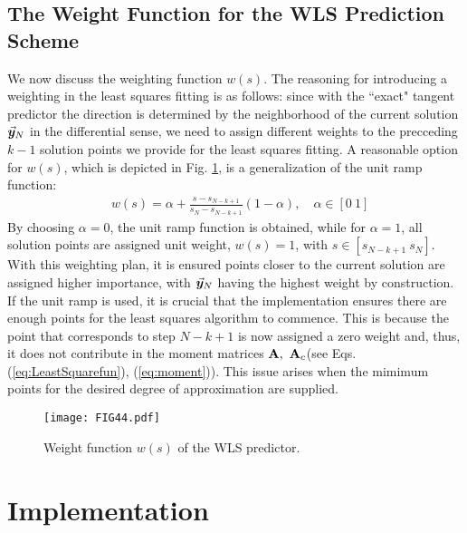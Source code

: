 \subsection{The Weight Function for the WLS Prediction Scheme}\label{CH5-S2SS4}

We now discuss the weighting function $w(s)$. The reasoning for introducing a
weighting in the least squares fitting is as follows: since with
the ``exact" tangent predictor the direction is determined by the neighborhood 
of
the current solution $\vec{\bm{y}}_N$ in the differential sense, we need to assign
different weights to the precceding $k-1$ solution points we provide for the 
least squares fitting. A reasonable option for $w(s)$, which is depicted in 
Fig. \ref{fig:FIG44}, is a generalization of the unit ramp function:
\begin{align}
	&w(s) = \alpha + \frac{s-s_{N-k+1}}{s_N-s_{N-k+1}}(1-\alpha)
	\tag{5.28}\label{eq:WeightFunction},\quad \alpha\in[0\ 1]
\end{align}
By choosing $\alpha=0$, the unit ramp function is obtained, while for
$\alpha=1$, all solution points are assigned unit weight, $w(s)=1$, with 
$s\in[s_{N-k+1}\ s_N]$.
With this weighting plan, it is
ensured points closer to the current solution are assigned higher importance,
with $\vec{\bm{y}}_N$ having the highest weight by construction. If the unit ramp is
used, it is crucial that the implementation ensures there are enough points for
the least squares algorithm to commence. This is because the point that
corresponds to step $N-k+1$ is now assigned a zero weight and, thus, it does not
contribute in the moment matrices $\bmat{A},\ \bmat{A}_c$(see Eqs.
(\ref{eq:LeastSquarefun}), (\ref{eq:moment})). This issue arises when the 
mimimum
points for the desired degree of approximation are supplied. 

\begin{figure}[t]
	\centering
	\texttt{[image: FIG44.pdf]}
	\caption{Weight function $w(s)$ of the WLS predictor.}
	\label{fig:FIG44}
\end{figure}


\section{Implementation}\label{CH5-S3}

